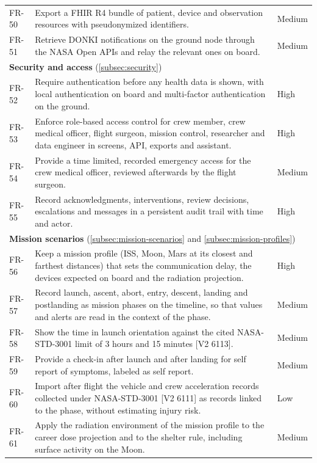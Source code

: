 {\begin{longtable}{p{1.5cm}p{10.8cm}p{1.5cm}}
FR-50 & Export a FHIR R4 bundle of patient, device and observation resources with pseudonymized identifiers. & Medium \\
FR-51 & Retrieve DONKI notifications on the ground node through the NASA Open APIs and relay the relevant ones on board. & Medium \\
\multicolumn{3}{l}{\textbf{Security and access} (\ref{subsec:security})} \\
FR-52 & Require authentication before any health data is shown, with local authentication on board and multi-factor authentication on the ground. & High \\
FR-53 & Enforce role-based access control for crew member, crew medical officer, flight surgeon, mission control, researcher and data engineer in screens, API, exports and assistant. & High \\
FR-54 & Provide a time limited, recorded emergency access for the crew medical officer, reviewed afterwards by the flight surgeon. & Medium \\
FR-55 & Record acknowledgments, interventions, review decisions, escalations and messages in a persistent audit trail with time and actor. & High \\
\multicolumn{3}{l}{\textbf{Mission scenarios} (\ref{subsec:mission-scenarios} and \ref{subsec:mission-profiles})} \\
FR-56 & Keep a mission profile (ISS, Moon, Mars at its closest and farthest distances) that sets the communication delay, the devices expected on board and the radiation projection. & High \\
FR-57 & Record launch, ascent, abort, entry, descent, landing and postlanding as mission phases on the timeline, so that values and alerts are read in the context of the phase. & Medium \\
FR-58 & Show the time in launch orientation against the cited NASA-STD-3001 limit of 3 hours and 15 minutes [V2 6113]. & Medium \\
FR-59 & Provide a check-in after launch and after landing for self report of symptoms, labeled as self report. & Medium \\
FR-60 & Import after flight the vehicle and crew acceleration records collected under NASA-STD-3001 [V2 6111] as records linked to the phase, without estimating injury risk. & Low \\
FR-61 & Apply the radiation environment of the mission profile to the career dose projection and to the shelter rule, including surface activity on the Moon. & Medium \\
\end{longtable}
}


